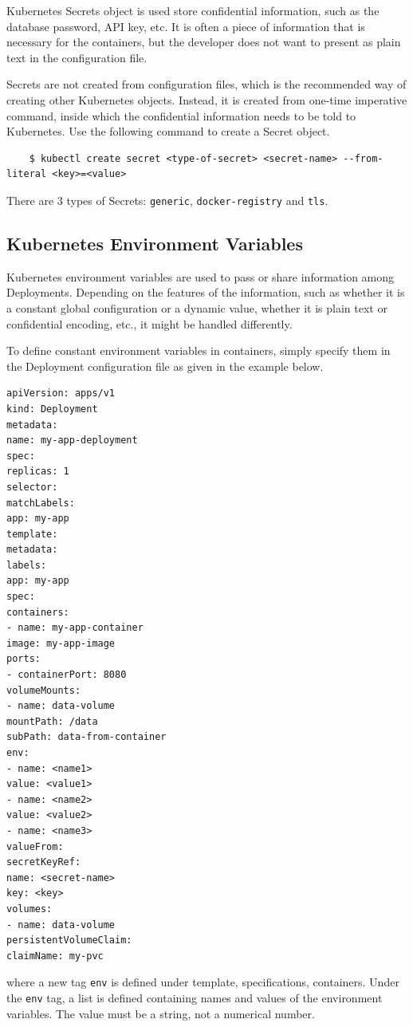 Kubernetes Secrets object is used store confidential information, such as the database password, API key, etc. It is often a piece of information that is necessary for the containers, but the developer does not want to present as plain text in the configuration file.

Secrets are not created from configuration files, which is the recommended way of creating other Kubernetes objects. Instead, it is created from one-time imperative command, inside which the confidential information needs to be told to Kubernetes. Use the following command to create a Secret object.
\begin{lstlisting}
	$ kubectl create secret <type-of-secret> <secret-name> --from-literal <key>=<value>
\end{lstlisting}
There are 3 types of Secrets: \verb|generic|, \verb|docker-registry| and \verb|tls|.

\subsection{Kubernetes Environment Variables}

Kubernetes environment variables are used to pass or share information among Deployments. Depending on the features of the information, such as whether it is a constant global configuration or a dynamic value, whether it is plain text or confidential encoding, etc., it might be handled differently.

To define constant environment variables in containers, simply specify them in the Deployment configuration file as given in the example below.

\begin{lstlisting}
apiVersion: apps/v1
kind: Deployment
metadata:
name: my-app-deployment
spec:
replicas: 1
selector:
matchLabels:
app: my-app
template:
metadata:
labels:
app: my-app
spec:
containers:
- name: my-app-container
image: my-app-image
ports:
- containerPort: 8080
volumeMounts:
- name: data-volume
mountPath: /data
subPath: data-from-container
env:
- name: <name1>
value: <value1>
- name: <name2>
value: <value2>
- name: <name3>
valueFrom:
secretKeyRef:
name: <secret-name>
key: <key>
volumes:
- name: data-volume
persistentVolumeClaim:
claimName: my-pvc
\end{lstlisting}
where a new tag \verb|env| is defined under template, specifications, containers. Under the \verb|env| tag, a list is defined containing names and values of the environment variables. The value must be a string, not a numerical number.

